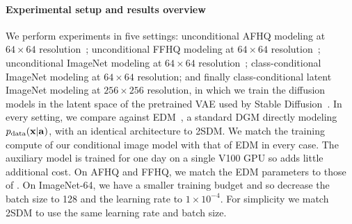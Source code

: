 \paragraph{Experimental setup and results overview}
We perform experiments in five settings: unconditional AFHQ modeling at $64\times64$ resolution~\citep{choi2020stargan}; unconditional FFHQ modeling at $64\times64$ resolution~\citep{karras2018style}; unconditional ImageNet modeling at $64\times64$ resolution~\citep{deng2009imagenet}; class-conditional ImageNet modeling at $64\times64$ resolution; and finally class-conditional latent ImageNet modeling at $256\times256$ resolution, in which we train the diffusion models in the latent space of the pretrained VAE used by Stable Diffusion~\citep{rombach2022high}. In every setting, we compare against EDM~\citep{karras2022elucidating}, a standard DGM directly modeling $p_{\rm{data}}({\mathbf{x}}|{\mathbf{a}})$, with an identical architecture to 2SDM. We match the training compute of our conditional image model with that of EDM in every case. The auxiliary model is trained for one day on a single V100 GPU so adds little additional cost. On AFHQ and FFHQ, we match the EDM parameters to those of \citet{karras2022elucidating}. On ImageNet-64, we have a smaller training budget and so decrease the batch size to 128 and the learning rate to $1\times10^{-4}$. For simplicity we match 2SDM to use the same learning rate and batch size.

